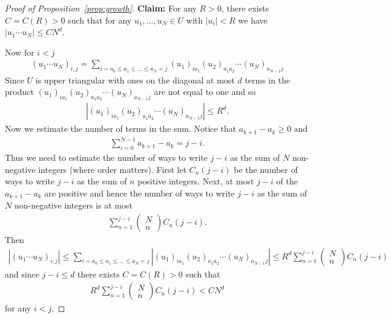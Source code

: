 \documentclass[12pt]{amsart}
\theoremstyle{plain}
\theoremstyle{definition}
\theoremstyle{remark}
\begin{document}
\begin{proof}[Proof of Proposition~\ref{prop:growth}]
\noindent \textbf{Claim:} For any $R>0$, there exists $C=C(R)>0$ such that for any $u_1, \dots, u_N \in U$ with ${\left|{u_i}\right|} < R$ we have ${\left|{ u_1 \cdots u_N}\right|} \leq CN^d$. \newline

Now for $i < j$ 
\begin{align*}
(u_1 \cdots u_N)_{i,j} = \sum_{i = a_0 \leq a_1 \leq \dots \leq a_N=j} (u_1)_{ia_1}(u_{2})_{a_1a_2} \cdots (u_N)_{a_{N-1}j}
\end{align*}
Since $U$ is upper triangular with ones on the diagonal at most $d$ terms in the product $(u_1)_{ia_1}(u_{2})_{a_1a_2} \cdots (u_N)_{a_{N-1}j}$ are not equal to one and so
\begin{align*}
{\left|{(u_1)_{ia_1}(u_{2})_{a_1a_2} \cdots (u_N)_{a_{N-1}j}}\right|} \leq R^d.
\end{align*}
Now we estimate the number of terms in the sum. Notice that $a_{k+1}-a_k \geq 0$ and 
\begin{align*}
\sum_{i=0}^{N-1} a_{k+1}-a_k=j-i.
\end{align*}
Thus we need to estimate the number of ways to write $j-i$ as the sum of $N$ non-negative integers (where order matters). First let $C_n(j-i)$ be the number of ways to write $j-i$ as the sum of $n$ positive integers. Next, at most $j-i$ of the $a_{k+1}-a_k$ are positive and hence the number of ways to write $j-i$ as the sum of $N$ non-negative integers is at most
\begin{align*}
\sum_{n=1}^{j-i} \begin{pmatrix} N \\ n \end{pmatrix}C_n(j-i).
\end{align*}
Then
\begin{align*}
{\left|{(u_1 \cdots u_N)_{i,j} }\right|}\leq  \sum_{i = a_0 \leq a_1 \leq \dots \leq a_N=j} {\left|{(u_1)_{ia_1}(u_{2})_{a_1a_2} \cdots (u_N)_{a_{N-1}j}}\right|} \leq R^d \sum_{n=1}^{j-i} \begin{pmatrix} N \\ n \end{pmatrix}C_n(j-i) 
\end{align*}
and since $j-i \leq d$ there exists $C=C(R)>0$ such that 
\begin{align*}
R^d \sum_{n=1}^{j-i} \begin{pmatrix} N \\ n \end{pmatrix} C_n(j-i) < CN^d
\end{align*}
for any $i<j$.
\end{proof}
\end{document}
